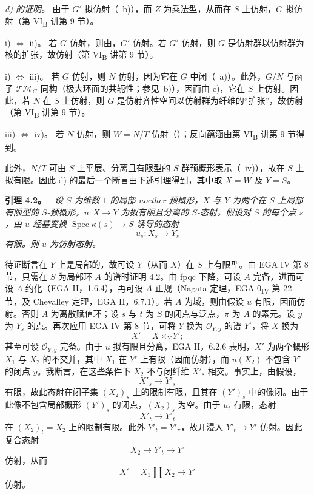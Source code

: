 \medskip
\noindent\textit{d) 的证明。}
由于 \(G'\) 拟仿射（~b)），而 \(Z\) 为乘法型，从而在 \(S\) 上仿射，\(G\) 拟仿射（第 VI\textsubscript{B} 讲第 9 节）。

\medskip
\noindent i) \(\Longleftrightarrow\) ii)。
若 \(G\) 仿射，则由，\(G'\) 仿射。若 \(G'\) 仿射，则 \(G\) 是仿射群以仿射群为核的扩张，故仿射（第 VI\textsubscript{B} 讲第 9 节）。

\medskip
\noindent i) \(\Longleftrightarrow\) iii)。
若 \(G\) 仿射，则 \(N\) 仿射，因为它在 \(G\) 中闭（~a)）。此外，\(G/N\) 与函子 \(\mathscr{TM}_G\) 同构（极大环面的共轭性；参见~b)），因而由 c)，它在 \(S\) 上仿射。因此，若 \(N\) 在 \(S\) 上仿射，则 \(G\) 是仿射齐性空间以仿射群为纤维的“扩张”，故仿射（第 VI\textsubscript{B} 讲第 9 节）。

\medskip
\noindent iii) \(\Longleftrightarrow\) iv)。
若 \(N\) 仿射，则 \(W=N/T\) 仿射（）；反向蕴涵由第 VI\textsubscript{B} 讲第 9 节得到。

此外，\(N/T\) 可由 \(S\) 上平展、分离且有限型的 \(S\)-群预概形表示（~iv)），故在 \(S\) 上拟有限。因此 d) 的最后一个断言由下述引理得到，其中取 \(X=W\) 及 \(Y=S\)。

\medskip
\noindent{}%
\textbf{引理 4.2。}---\textit{设 \(S\) 为维数 \(1\) 的局部 noether 预概形，\(X\) 与 \(Y\) 为两个在 \(S\) 上局部有限型的 \(S\)-预概形，\(u:X\to Y\) 为拟有限且分离的 \(S\)-态射。假设对 \(S\) 的每个点 \(s\)，由 \(u\) 经基变换 \(\operatorname{Spec}\kappa(s)\to S\) 诱导的态射}
\[
  u_s:X_s\longrightarrow Y_s
\]
\textit{有限。则 \(u\) 为仿射态射。}

\medskip
待证断言在 \(Y\) 上是局部的，故可设 \(Y\)（从而 \(X\)）在 \(S\) 上有限型。由 EGA IV 第 8 节，只需在 \(S\) 为局部环 \(A\) 的谱时证明 4.2。由 fpqc 下降，可设 \(A\) 完备，进而可设 \(A\) 约化（EGA II，1.6.4），再可设 \(A\) 正规（Nagata 定理，EGA 0\textsubscript{IV} 第 22 节，及 Chevalley 定理，EGA II，6.7.1）。若 \(A\) 为域，则由假设 \(u\) 有限，因而仿射。否则 \(A\) 为离散赋值环；设 \(s\) 与 \(t\) 为 \(S\) 的闭点与泛点，\(\pi\) 为 \(A\) 的素元。设 \(y\) 为 \(Y_s\) 的点。再次应用 EGA IV 第 8 节，可将 \(Y\) 换为 \(\mathcal O_{Y,y}\) 的谱 \(Y'\)，将 \(X\) 换为
\[
  X'=X\times_Y Y';
\]
甚至可设 \(\mathcal O_{Y,y}\) 完备。由于 \(u\) 拟有限且分离，EGA II，6.2.6 表明，\(X'\) 为两个概形 \(X_1\) 与 \(X_2\) 的不交并，其中 \(X_1\) 在 \(Y'\) 上有限（因而仿射），而 \(u(X_2)\) 不包含 \(Y'\) 的闭点 \(y\)。我断言，在这些条件下 \(X_2\) 不与闭纤维 \(X'_s\) 相交。事实上，由假设，
\[
  X'_s\longrightarrow Y'_s
\]
有限，故此态射在闭子集 \((X_2)_s\) 上的限制有限，且其在 \((Y')_s\) 中的像闭。由于此像不包含局部概形 \((Y')_s\) 的闭点，\((X_2)_s\) 为空。由于 \(u_t\) 有限，态射
\[
  X'_t\longrightarrow Y'_t
\]
在 \((X_2)_t=X_2\) 上的限制有限。此外 \(Y'_t=Y'_\pi\)，故开浸入 \(Y'_t\to Y'\) 仿射。因此复合态射
\[
  X_2\longrightarrow Y'_t\longrightarrow Y'
\]
仿射，从而
\[
  X'=X_1\amalg X_2\longrightarrow Y'
\]
仿射。

